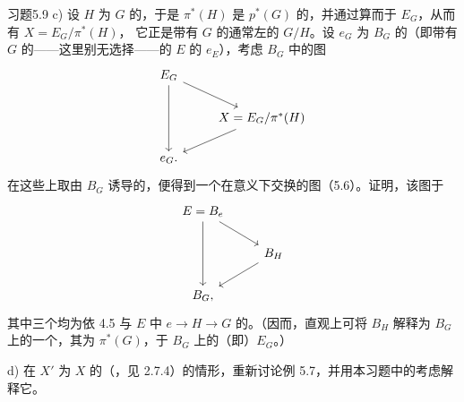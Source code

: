 \begin{SGAresult}{习题}{5.9}
 c) 设 $H$ 为 $G$ 的，于是 $\pi^*(H)$ 是 $p^*(G)$ 的，并通过算而于 $E_G$，从而有 $X=E_G/\pi^*(H)$，
它正是带有 $G$ 的通常左的 $G/H$。设 $e_G$ 为 $B_G$ 的（即带有 $G$ 的——这里别无选择——的 $E$ 的 $e_E$），考虑 $B_G$ 中的图
\[\begin{tikzcd}E_G\arrow[dr]\arrow[dd]\\&X=E_G/\pi^*(H)\arrow[dl]\\e_G.\end{tikzcd}\]
在这些上取由 $B_G$ 诱导的，便得到一个在意义下交换的图（5.6）。证明，该图于
\[\begin{tikzcd}E=B_e\arrow[dr]\arrow[dd]\\&B_H\arrow[dl]\\B_G,\end{tikzcd}\]
其中三个均为依 4.5 与 $E$ 中 $e\to H\to G$ 的。（因而，直观上可将 $B_H$ 解释为 $B_G$ 上的一个，其为 $\pi^*(G)$，于 $B_G$ 上的（即）$E_G$。）

 d) 在 $X'$ 为 $X$ 的（，见 2.7.4）的情形，重新讨论例 5.7，并用本习题中的考虑解释它。
\end{SGAresult}

